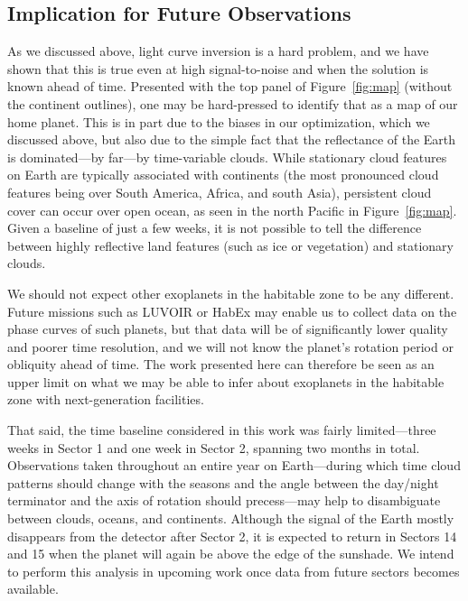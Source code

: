 \documentclass[modern]{aastex62}
\begin{document}
\subsection{Implication for Future Observations}
\label{sec:otherplanets}

As we discussed above, light curve inversion is a hard problem,
and we have shown that this is true even at high signal-to-noise and 
when the solution is
known ahead of time. Presented with the top panel of Figure~\ref{fig:map}
(without the continent outlines),
one may be hard-pressed to identify that
as a map of our home planet. This is in part due to the biases
in our optimization, which we discussed above, but also due to the 
simple fact that the reflectance of the Earth is dominated---by far---by 
time-variable clouds. While stationary cloud features on Earth are
typically associated with continents (the most pronounced cloud features
being over South America, Africa, and south Asia), persistent cloud
cover can occur over open ocean, as seen in the north Pacific
in Figure~\ref{fig:map}. Given a baseline of just a few weeks, it is
not possible to tell the difference between highly reflective land
features (such as ice or vegetation) and stationary clouds.

We should not expect other exoplanets in the habitable zone to be
any different. Future missions such as LUVOIR or HabEx may enable
us to collect data on the phase curves of such planets, but that
data will be of significantly lower quality and poorer time resolution,
and we will not know the planet's rotation period or obliquity ahead of time.
The work presented here can therefore be seen as an upper limit on what we may
be able to infer about exoplanets in the habitable zone with
next-generation facilities.

That said, the time baseline considered in this work was fairly
limited---three weeks in Sector 1 and one week in Sector 2,
spanning two months in total. Observations taken throughout an entire
year on Earth---during which time cloud patterns should change with the
seasons and the angle between the day/night terminator and the 
axis of rotation should precess---may help to disambiguate between
clouds, oceans, and continents. Although the signal of the Earth 
mostly disappears from the \tess detector after Sector 2, it is
expected to return in Sectors 14 and 15 when the planet will again
be above the edge of the sunshade.
We intend to perform this analysis
in upcoming work once data from future \TESS sectors becomes available.
\end{document}

